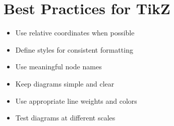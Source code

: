 \documentclass{article}
\begin{document}
\section{Best Practices for TikZ}
\begin{itemize}
    \item Use relative coordinates when possible
    \item Define styles for consistent formatting
    \item Use meaningful node names
    \item Keep diagrams simple and clear
    \item Use appropriate line weights and colors
    \item Test diagrams at different scales
\end{itemize}
\end{document}
